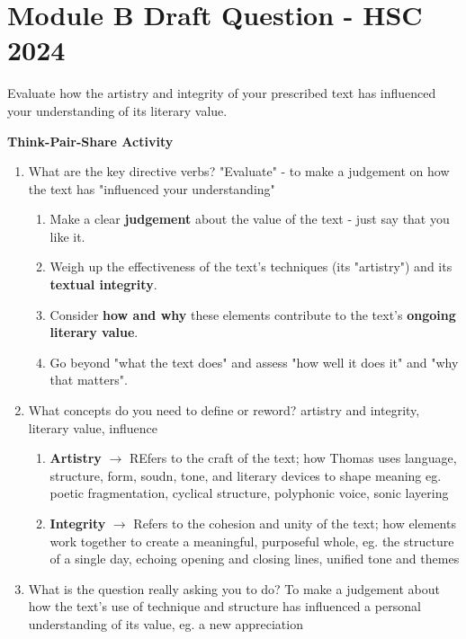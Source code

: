 \newpage

\section{Module B Draft Question - HSC 2024} \label{22/05/2025}

	Evaluate how the artistry and integrity of your prescribed text has influenced your understanding of its literary value.

	\textbf{Think-Pair-Share Activity}
		
		\begin{enumerate}
			\item What are the key directive verbs?
				\subitem "Evaluate" - to make a judgement on how the text has "influenced your understanding"
				\begin{enumerate}
					\item Make a clear \textbf{judgement} about the value of the text - just say that you like it.
					\item Weigh up the effectiveness of the text's techniques (its "artistry") and its \textbf{textual integrity}.
					\item Consider \textbf{how and why} these elements contribute to the text's \textbf{ongoing literary value}.
					\item Go beyond "what the text does" and assess "how well it does it" and "why that matters".
				\end{enumerate}

			\item What concepts do you need to define or reword?
				\subitem artistry and integrity, literary value, influence
				\begin{enumerate}
					\item \textbf{Artistry} $\rightarrow$ REfers to the craft of the text; how Thomas uses language, structure, form, soudn, tone, and literary devices to shape meaning eg. poetic fragmentation, cyclical structure, polyphonic voice, sonic layering
					\item \textbf{Integrity} $\rightarrow$ Refers to the cohesion and unity of the text; how elements work together to create a meaningful, purposeful whole, eg. the structure of a single day, echoing opening and closing lines, unified tone and themes
				\end{enumerate}

			\item What is the question really asking you to do?
				\subitem To make a judgement about how the text's use of technique and structure has influenced a personal understanding of its value, eg. a new appreciation
		\end{enumerate}

